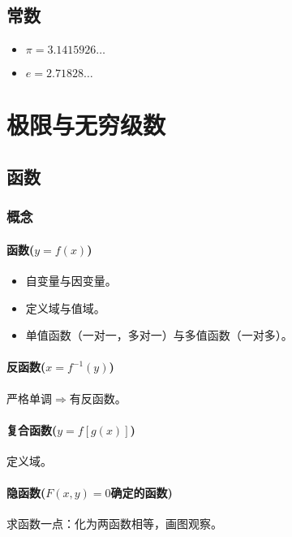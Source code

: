 \documentclass[
12pt, %
a4paper, 
oneside, %
headinclude,footinclude, %
]{scrartcl}
\begin{document}
\subsection[常数]{常数}
\begin{itemize}
\item $ \pi = 3.1415926 \dots $
\item $ e = 2.71828 \dots $
\end{itemize}
\section{极限与无穷级数}
\subsection[函数]{函数}
\subsubsection[概念]{概念}
\paragraph{函数($ y = f(x) $)}
\begin{itemize}
\item 自变量与因变量。
\item 定义域与值域。
\item 单值函数（一对一，多对一）与多值函数（一对多）。
\end{itemize}
\paragraph{反函数($ x = f^{-1}(y) $)}
严格单调$ \Rightarrow $有反函数。
\paragraph{复合函数($ y = f[g(x)] $)}
定义域。
\paragraph{隐函数($ F(x,y) = 0 $确定的函数)}
求函数一点：化为两函数相等，画图观察。
\end{document}
